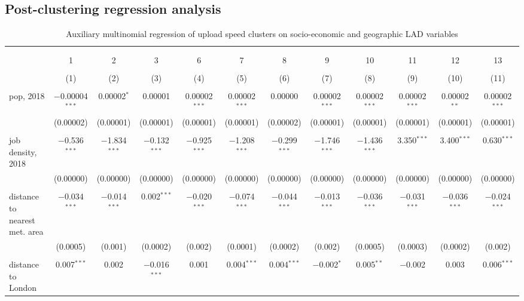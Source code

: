 \documentclass[Royal,times,sageh]{sagej}
\begin{document}
\hypertarget{sec:4.2}{%
\subsection{Post-clustering regression analysis}\label{sec:4.2}}

\begin{table} \centering 
  \caption{Auxiliary multinomial regression of upload speed clusters on socio-economic and geographic LAD variables\label{aux}} 
  \label{} 
\tiny 
\begin{tabular}{@{\extracolsep{5pt}}lccccccccccc} 
\\[-1.8ex]\hline 
\hline \\[-1.8ex] 
\\[-1.8ex] & 1 & 2 & 3 & 6 & 7 & 8 & 9 & 10 & 11 & 12 & 13 \\ 
\\[-1.8ex] & (1) & (2) & (3) & (4) & (5) & (6) & (7) & (8) & (9) & (10) & (11)\\ 
\hline \\[-1.8ex] 
 pop, 2018 & $-$0.00004$^{***}$ & 0.00002$^{*}$ & 0.00001 & 0.00002$^{***}$ & 0.00002$^{***}$ & 0.00000 & 0.00002$^{***}$ & 0.00002$^{***}$ & 0.00002$^{***}$ & 0.00002$^{**}$ & 0.00002$^{***}$ \\ 
  & (0.00002) & (0.00001) & (0.00001) & (0.00001) & (0.00001) & (0.00002) & (0.00001) & (0.00001) & (0.00001) & (0.00001) & (0.00001) \\ 
  & & & & & & & & & & & \\ 
 job density, 2018 & $-$0.536$^{***}$ & $-$1.834$^{***}$ & $-$0.132$^{***}$ & $-$0.925$^{***}$ & $-$1.208$^{***}$ & $-$0.299$^{***}$ & $-$1.746$^{***}$ & $-$1.436$^{***}$ & 3.350$^{***}$ & 3.400$^{***}$ & 0.630$^{***}$ \\ 
  & (0.00000) & (0.00000) & (0.00000) & (0.00000) & (0.00000) & (0.00000) & (0.00000) & (0.00000) & (0.00000) & (0.00000) & (0.00000) \\ 
  & & & & & & & & & & & \\ 
 distance to nearest met. area & $-$0.034$^{***}$ & $-$0.014$^{***}$ & 0.002$^{***}$ & $-$0.020$^{***}$ & $-$0.074$^{***}$ & $-$0.044$^{***}$ & $-$0.013$^{***}$ & $-$0.036$^{***}$ & $-$0.031$^{***}$ & $-$0.036$^{***}$ & $-$0.024$^{***}$ \\ 
  & (0.0005) & (0.001) & (0.0002) & (0.002) & (0.0001) & (0.0002) & (0.002) & (0.0005) & (0.0003) & (0.0002) & (0.002) \\ 
  & & & & & & & & & & & \\ 
 distance to London & 0.007$^{***}$ & 0.002 & $-$0.016$^{***}$ & 0.001 & 0.004$^{***}$ & 0.004$^{***}$ & $-$0.002$^{*}$ & 0.005$^{**}$ & $-$0.002 & 0.003 & 0.006$^{***}$ \\ 

\end{tabular}
\end{table}
\end{document}
